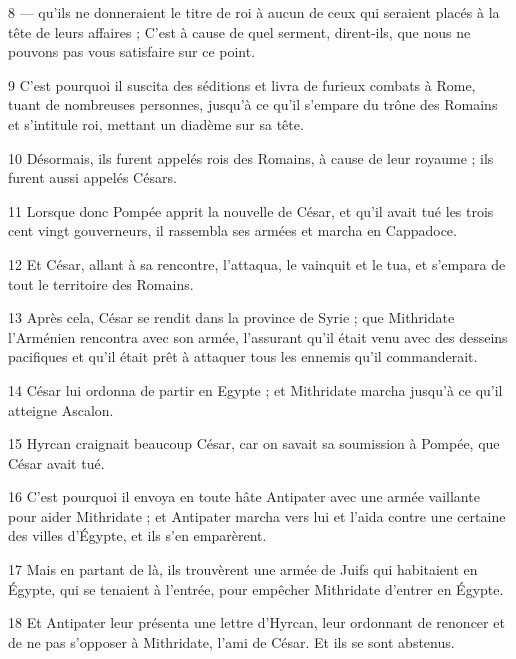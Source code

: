 \par 8 — qu'ils ne donneraient le titre de roi à aucun de ceux qui seraient placés à la tête de leurs affaires ; C'est à cause de quel serment, dirent-ils, que nous ne pouvons pas vous satisfaire sur ce point.

\par 9 C'est pourquoi il suscita des séditions et livra de furieux combats à Rome, tuant de nombreuses personnes, jusqu'à ce qu'il s'empare du trône des Romains et s'intitule roi, mettant un diadème sur sa tête.

\par 10 Désormais, ils furent appelés rois des Romains, à cause de leur royaume ; ils furent aussi appelés Césars.

\par 11 Lorsque donc Pompée apprit la nouvelle de César, et qu'il avait tué les trois cent vingt gouverneurs, il rassembla ses armées et marcha en Cappadoce.

\par 12 Et César, allant à sa rencontre, l'attaqua, le vainquit et le tua, et s'empara de tout le territoire des Romains.

\par 13 Après cela, César se rendit dans la province de Syrie ; que Mithridate l'Arménien rencontra avec son armée, l'assurant qu'il était venu avec des desseins pacifiques et qu'il était prêt à attaquer tous les ennemis qu'il commanderait.

\par 14 César lui ordonna de partir en Egypte ; et Mithridate marcha jusqu'à ce qu'il atteigne Ascalon.

\par 15 Hyrcan craignait beaucoup César, car on savait sa soumission à Pompée, que César avait tué.

\par 16 C'est pourquoi il envoya en toute hâte Antipater avec une armée vaillante pour aider Mithridate ; et Antipater marcha vers lui et l'aida contre une certaine des villes d'Égypte, et ils s'en emparèrent.

\par 17 Mais en partant de là, ils trouvèrent une armée de Juifs qui habitaient en Égypte, qui se tenaient à l'entrée, pour empêcher Mithridate d'entrer en Égypte.

\par 18 Et Antipater leur présenta une lettre d'Hyrcan, leur ordonnant de renoncer et de ne pas s'opposer à Mithridate, l'ami de César. Et ils se sont abstenus.

